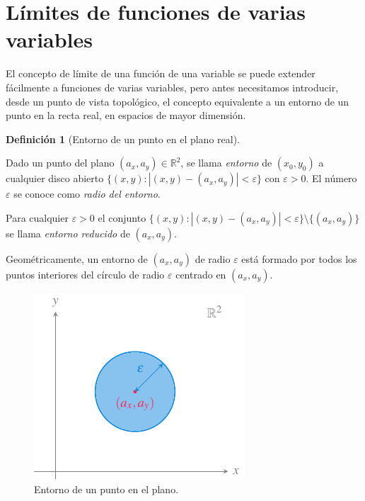 \documentclass[
  a4paper,
]{scrreport}
\theoremstyle{definition}
\newtheorem{definition}{Definición}[chapter]
\theoremstyle{plain}
\theoremstyle{plain}
\theoremstyle{definition}
\theoremstyle{definition}
\theoremstyle{plain}
\theoremstyle{remark}
\begin{document}
\hypertarget{luxedmites-de-funciones-de-varias-variables}{%
\section{Límites de funciones de varias
variables}\label{luxedmites-de-funciones-de-varias-variables}}

El concepto de límite de una función de una variable se puede extender
fácilmente a funciones de varias variables, pero antes necesitamos
introducir, desde un punto de vista topológico, el concepto equivalente
a un entorno de un punto en la recta real, en espacios de mayor
dimensión.

\begin{definition}[Entorno de un punto en el plano
real]\protect\hypertarget{def-entorno-punto-plano}{}\label{def-entorno-punto-plano}

Dado un punto del plano \((a_x,a_y)\in \mathbb{R}^2\), se llama
\emph{entorno} de \((x_0,y_0)\) a cualquier disco abierto
\(\{(x,y):|(x,y)-(a_x,a_y)|<\varepsilon\}\) con \(\varepsilon>0\). El
número \(\varepsilon\) se conoce como \emph{radio del entorno}.

Para cualquier \(\varepsilon>0\) el conjunto
\(\{(x,y):|(x,y)-(a_x,a_y)|<\varepsilon\}\setminus \{(a_x,a_y)\}\) se
llama \emph{entorno reducido} de \((a_x,a_y)\).

\end{definition}

Geométricamente, un entorno de \((a_x,a_y)\) de radio \(\varepsilon\)
está formado por todos los puntos interiores del círculo de radio
\(\varepsilon\) centrado en \((a_x,a_y)\).

\begin{figure}

{\centering \includegraphics{img/derivadas-funciones-varias-variables/entorno-punto-plano.pdf}

}

\caption{Entorno de un punto en el plano.}

\end{figure}
\end{document}
